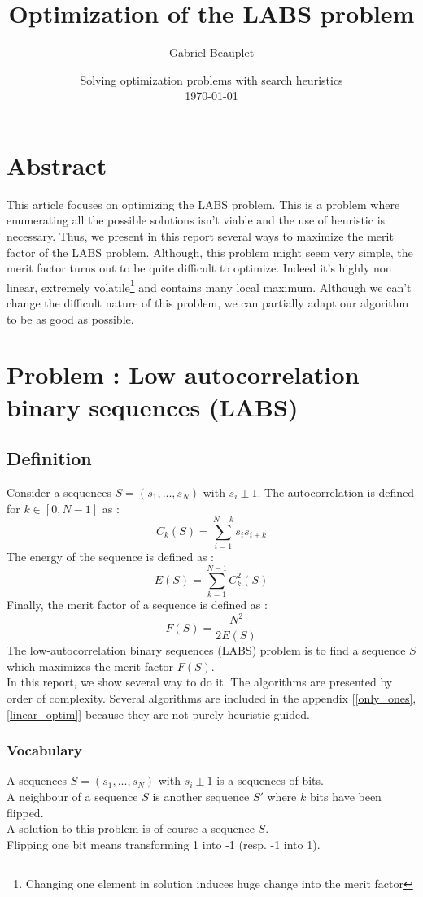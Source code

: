 \documentclass[a4paper,11pt,openany]{article}
\title{Optimization of the LABS problem}
\author{Gabriel Beauplet}
\date{%
    Solving optimization problems with search heuristics\\%
    \today
}
\begin{document}
\maketitle
\lstset{language=Python}
\section*{Abstract}
\noindent
This article focuses on optimizing the LABS problem. This is a problem where enumerating all the possible solutions isn't viable and the use of heuristic is necessary. Thus, we present in this report several ways to maximize the merit factor of the LABS problem. Although, this problem might seem very simple, the merit factor turns out to be quite difficult to optimize. Indeed it's highly non linear, extremely volatile\footnote{Changing one element in solution induces huge change into the merit factor} and contains many local maximum. Although we can't change the difficult nature of this problem, we can partially adapt our algorithm to be as good as possible.
\section{Problem : Low autocorrelation binary sequences (LABS)}
\subsection{Definition}
\noindent
Consider a sequences $S=(s_1,...,s_N)$ with $s_i\pm 1$. The autocorrelation is defined for $k \in [0,N-1]$ as :
\begin{equation}
C_k(S)=\sum_{i=1}^{N-k} s_is_{i+k}
\end{equation}
The energy of the sequence is defined as :
\begin{equation}
E(S)=\sum_{k=1}^{N-1} C_k^2(S)
\end{equation}
Finally, the merit factor of a sequence is defined as :
\begin{equation}
F(S)=\frac{N^2}{2E(S)}
\end{equation}
The low-autocorrelation binary sequences (LABS) problem is to find a sequence $S$ which maximizes the merit factor $F(S)$.\\
In this report, we show several way to do it. The algorithms are presented by order of complexity. Several algorithms are included in the appendix [\ref{only_ones},\ref{linear_optim}] because they are not purely heuristic guided.
\subsubsection{Vocabulary}
\noindent
A sequences $S=(s_1,...,s_N)$ with $s_i\pm 1$ is a sequences of bits.\\
A neighbour of a sequence $S$ is another sequence $S'$ where $k$ bits have been flipped.\\
A solution to this problem is of course a sequence $S$.\\
Flipping one bit means transforming 1 into -1 (resp. -1 into 1).
\end{document}
